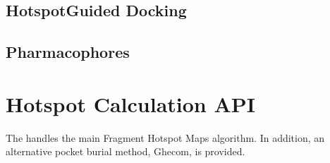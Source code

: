 \documentclass[letterpaper,10pt,english]{sphinxmanual}
\begin{document}
\noindent{}


\section{Hotspot\sphinxhyphen{}Guided Docking}
\label{\detokenize{tutorial:hotspot-guided-docking}}
\begin{sphinxVerbatim}[commandchars=\\\{\}]

\end{sphinxVerbatim}


\section{Pharmacophores}
\label{\detokenize{tutorial:pharmacophores}}
\begin{sphinxVerbatim}[commandchars=\\\{\}]

\end{sphinxVerbatim}


\chapter{Hotspot Calculation API}
\label{\detokenize{calculation_api:module-hotspots.calculation}}\label{\detokenize{calculation_api:hotspot-calculation-api}}\label{\detokenize{calculation_api::doc}}
The {\hyperref[\detokenize{calculation_api:module-hotspots.calculation}]{}} handles the main Fragment Hotspot Maps algorithm. In addition, an alternative pocket burial method, Ghecom, is provided.
\end{document}

